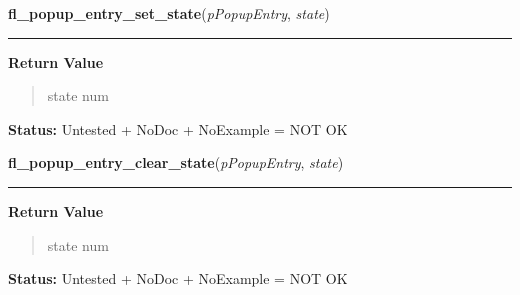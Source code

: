     \label{xformslib:library:fl_popup_entry_set_state}

    \vspace{0.5ex}

\hspace{.8\funcindent}\begin{boxedminipage}{\funcwidth}

    \raggedright \textbf{fl\_popup\_entry\_set\_state}(\textit{pPopupEntry}, \textit{state})

    \vspace{-1.5ex}

    \rule{\textwidth}{0.5\fboxrule}
\setlength{\parskip}{2ex}
\setlength{\parskip}{1ex}
      \textbf{Return Value}
    \vspace{-1ex}

      \begin{quote}
      state num

      \end{quote}

\textbf{Status:} Untested + NoDoc + NoExample = NOT OK



    \end{boxedminipage}

    \label{xformslib:library:fl_popup_entry_clear_state}

    \vspace{0.5ex}

\hspace{.8\funcindent}\begin{boxedminipage}{\funcwidth}

    \raggedright \textbf{fl\_popup\_entry\_clear\_state}(\textit{pPopupEntry}, \textit{state})

    \vspace{-1.5ex}

    \rule{\textwidth}{0.5\fboxrule}
\setlength{\parskip}{2ex}
\setlength{\parskip}{1ex}
      \textbf{Return Value}
    \vspace{-1ex}

      \begin{quote}
      state num

      \end{quote}

\textbf{Status:} Untested + NoDoc + NoExample = NOT OK



    \end{boxedminipage}

